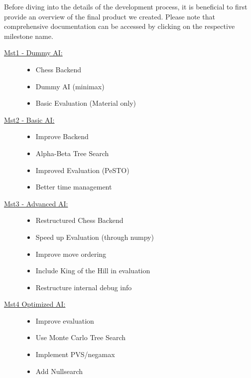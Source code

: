 Before diving into the details of the
development process, it is beneficial to first provide an overview of the final product we created. Please note that comprehensive documentation can be accessed by clicking on the respective milestone name.

\begin{description}
  \item[\href{https://github.com/PraxTube/chess-ai/tree/master/docs/milestones/1-dummy-AI}{Mst1 - Dummy AI:}] \hfill
    \begin{itemize}
      \item Chess Backend
      \item Dummy AI (minimax)
      \item Basic Evaluation (Material only)
    \end{itemize}
  \item[\href{https://github.com/PraxTube/chess-ai/tree/master/docs/milestones/2-basic-AI}{Mst2 - Basic AI:}] \hfill
    \begin{itemize}
      \item Improve Backend
      \item Alpha-Beta Tree Search
      \item Improved Evaluation (PeSTO)
      \item Better time management
    \end{itemize}
  \item[\href{https://github.com/PraxTube/chess-ai/tree/master/docs/milestones/3-advanced-AI}{Mst3 - Advanced AI:}] \hfill
    \begin{itemize}
      \item Restructured Chess Backend
      \item Speed up Evaluation (through numpy)
      \item Improve move ordering
      \item Include King of the Hill in evaluation
      \item Restructure internal debug info
    \end{itemize}
  \item[\href{https://github.com/PraxTube/chess-ai/tree/master/docs/milestones/4-optimized-AI}{Mst4 Optimized AI:}] \hfill
    \begin{itemize}
      \item Improve evaluation
      \item Use Monte Carlo Tree Search
      \item Implement PVS/negamax
      \item Add Nullsearch
    \end{itemize}
\end{description}

